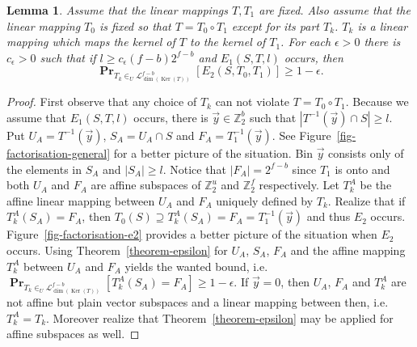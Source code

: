 \documentclass{article}
\newcommand{\vecspace}[2]{\mathbb{Z}_{#1}^{#2}}
\newcommand{\binvecspace}[1]{\vecspace{2}{#1}}
\newcommand{\linearmaps}[2]{\mathcal{L}_{#1}^{#2}}
\newcommand{\probs}[2]{\operatorname{\mathbf{Pr}}_{{#1}}\left[{#2}\right]}
\newtheorem{lemma}{Lemma}
\begin{document}
\begin{lemma}
\label{lemma-e1-e2}
Assume that the linear mappings $T, T_1$ are fixed.
Also assume that the linear mapping $T_0$ is fixed so that $T = T_0 \circ T_1$ except for its part $T_k$. $T_k$ is a linear mapping which maps the kernel of $T$ to the kernel of $T_1$.
For each $\epsilon > 0$ there is $c_\epsilon > 0$ such that if $l \geq c_\epsilon (f - b)2^{f-b}$ and $E_1(S, T, l)$ occurs, then
\[
\probs{T_k \in_U \linearmaps{\operatorname{dim}(\operatorname{Ker}(T))}{f-b}}{E_2(S, T_0, T_1)} \geq 1 - \epsilon.
\]
\end{lemma}
\begin{proof}
First observe that any choice of $T_k$ can not violate $T = T_0 \circ T_1$.
Because we assume that $E_1(S, T, l)$ occurs, there is $\vec{y} \in \binvecspace{b}$ such that $|T^{-1}(\vec{y}) \cap S| \geq l$.
Put $U_A = T^{-1}(\vec{y})$, $S_A = U_A \cap S$ and $F_A = T_1^{-1}(\vec{y})$.
See Figure~\ref{fig-factorisation-general} for a better picture of the situation.
Bin $\vec{y}$ consists only of the elements in $S_A$ and $|S_A| \geq l$.
Notice that $|F_A| = 2^{f-b}$ since $T_1$ is onto and both $U_A$ and $F_A$ are affine subspaces of $\binvecspace{u}$ and $\binvecspace{f}$ respectively. 
Let $T_k^A$ be the affine linear mapping between $U_A$ and $F_A$ uniquely defined by $T_k$.
Realize that if $T_k^A(S_A) = F_A$, then $T_0(S) \supseteq T_k^A(S_A) = F_A = T_1^{-1}(\vec{y})$ and thus $E_2$ occurs.
Figure~\ref{fig-factorisation-e2} provides a better picture of the situation when $E_2$ occurs.
Using Theorem~\ref{theorem-epsilon} for $U_A$, $S_A$, $F_A$ and the affine mapping $T_k^A$ between $U_A$ and $F_A$ yields the wanted bound, i.e. $\probs{T_k \in_U \linearmaps{\operatorname{dim}(\operatorname{Ker}(T))}{f-b}}{T_k^A(S_A) = F_A} \geq 1 - \epsilon$. 
If $\vec{y} = 0$, then $U_A$, $F_A$ and $T_k^A$ are not affine but plain vector subspaces and a linear mapping between then, i.e. $T_k^A = T_k$.
Moreover realize that Theorem~\ref{theorem-epsilon} may be applied for affine subspaces as well.
\end{proof}
\end{document}
